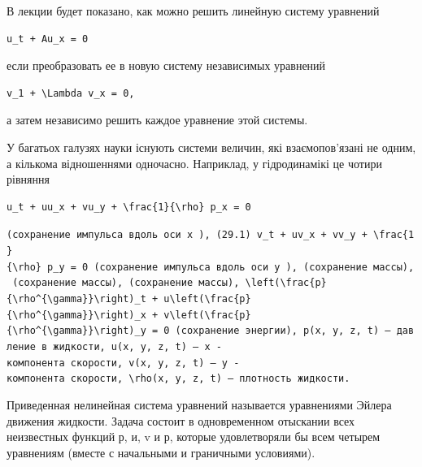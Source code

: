 \documentclass[
  ukrainian,
]{article}
\begin{document}
В лекции будет показано, как можно решить линейную систему уравнений

\begin{verbatim}
u_t + Au_x = 0
\end{verbatim}

если преобразовать ее в новую систему независимых уравнений

\begin{verbatim}
v_1 + \Lambda v_x = 0,
\end{verbatim}

а затем независимо решить каждое уравнение этой системы.

У багатьох галузях науки існують системи величин, які взаємопов'язані не
одним, а кількома відношеннями одночасно. Наприклад, у гідродинамікі це
чотири рівняння

\begin{verbatim}
u_t + uu_x + vu_y + \frac{1}{\rho} p_x = 0
\end{verbatim}

\texttt{(сохранение\ импульса\ вдоль\ оси\ \textquotesingle{}x\textquotesingle{}\ ),\ (29.1)\ \textquotesingle{}v\_t\ +\ uv\_x\ +\ vv\_y\ +\ \textbackslash{}frac\{1\}\{\textbackslash{}rho\}\ p\_y\ =\ 0\textquotesingle{}\ (сохранение\ импульса\ вдоль\ оси\ \textquotesingle{}y\textquotesingle{}\ ),\ (сохранение\ массы),\ (сохранение\ массы),\ (сохранение\ массы),\ \textquotesingle{}\textbackslash{}left(\textbackslash{}frac\{p\}\{\textbackslash{}rho\^{}\{\textbackslash{}gamma\}\}\textbackslash{}right)\_t\ +\ u\textbackslash{}left(\textbackslash{}frac\{p\}\{\textbackslash{}rho\^{}\{\textbackslash{}gamma\}\}\textbackslash{}right)\_x\ +\ v\textbackslash{}left(\textbackslash{}frac\{p\}\{\textbackslash{}rho\^{}\{\textbackslash{}gamma\}\}\textbackslash{}right)\_y\ =\ 0\textquotesingle{}\ (сохранение\ энергии),\ \textquotesingle{}p(x,\ y,\ z,\ t)\textquotesingle{}\ —\ давление\ в\ жидкости,\ \textquotesingle{}u(x,\ y,\ z,\ t)\textquotesingle{}\ —\ \textquotesingle{}x\textquotesingle{}\ -компонента\ скорости,\ \textquotesingle{}v(x,\ y,\ z,\ t)\textquotesingle{}\ —\ \textquotesingle{}y\textquotesingle{}\ -компонента\ скорости,\ \textquotesingle{}\textbackslash{}rho(x,\ y,\ z,\ t)\textquotesingle{}\ —\ плотность\ жидкости.}

Приведенная нелинейная система уравнений называется уравнениями Эйлера
движения жидкости. Задача состоит в одновременном отыскании всех
неизвестных функций р, и, v и р, которые удовлетворяли бы всем четырем
уравнениям (вместе с начальными и граничными условиями).
\end{document}
